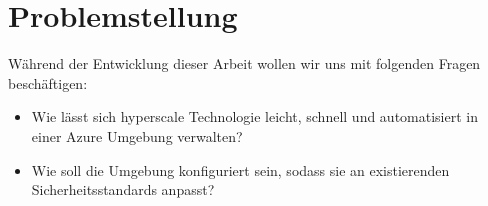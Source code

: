 \section{Problemstellung}

Während der Entwicklung dieser Arbeit wollen wir uns mit folgenden Fragen beschäftigen:

\begin{itemize}
   \item Wie lässt sich \gls{hyperscale} Technologie leicht, schnell und automatisiert in einer Azure Umgebung verwalten?
   \item Wie soll die Umgebung konfiguriert sein, sodass sie an existierenden Sicherheitsstandards anpasst?
\end{itemize}